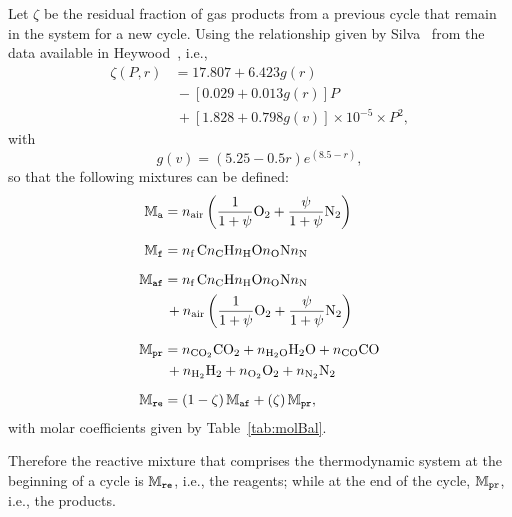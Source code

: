     Let $\zeta$ be the residual fraction of gas products from a previous cycle that remain in the system for a new cycle. Using the relationship given by Silva~\cite{2018-SilvaRKO-UTFPR}  from
    the data available in Heywood~\cite{1988-HeywoodJB-McGrawHill}, i.e.,%
    \begin{align}
        \zeta(P, r) &= 17.807 + 6.423g(r) \nonumber\\
                    &\,- [0.029 + 0.013g(r)] P \nonumber\\
                    &\,+ [1.828 + 0.798g(v)] \times 10^{-5} \times P^2,
        \label{eq:zeta}
    \end{align}
    \noindent with%
    \begin{equation}
        g(v) = (5.25 - 0.5r) e^{(8.5 - r)},
        \label{eq:g}
    \end{equation}
    \noindent so that the following mixtures can be defined:%
    \begin{align}
        \label{eq:MXAIR}
        \MXAIR  &=  \NA\left(
                        \frac{1}{1+\psi}\mbox{\ce{O2}} +
                        \frac{\psi}{1+\psi}\mbox{\ce{N2}}
                    \right)
                \\[\medskipamount]
        \label{eq:MXFUE}
        \MXFUE  &=  \NF\,\mbox{\ce{C\NC H\NH O\NO N\NN}}
                \\[\medskipamount]
        \label{eq:MXAFU}
        \MXAFU  &=  \NF\,\mbox{\ce{C\NC H\NH O\NO N\NN}} \nonumber\\
                &\,+\NA\left(
                        \frac{1}{1+\psi}\mbox{\ce{O2}} +
                        \frac{\psi}{1+\psi}\mbox{\ce{N2}}
                    \right)
                \\[\medskipamount]
        \label{eq:MXPRO}
        \MXPRO  &=  \NCOO\mbox{\ce{CO2}} +
                    \NHHO\mbox{\ce{H2O}} +
                    \NCO\mbox{\ce{CO}} \nonumber\\
                &\,+\NHH\mbox{\ce{H2}} +
                    \NOO\mbox{\ce{O2}} +
                    \NNN\mbox{\ce{N2}}
                \\[\medskipamount]
        \label{eq:MXREA}
        \MXREA  &=  (1 - \zeta)\,\MXAFU + (\zeta)\,\MXPRO,
    \end{align}
    \noindent with molar coefficients given by Table~\ref{tab:molBal}.

    Therefore the reactive mixture that comprises the thermodynamic system at the beginning of a cycle is $\mathbb{M}_{\mbox{\scriptsize\tt re}}$, i.e., the reagents; while at the end  of  the  cycle,  $\mathbb{M}_{\mbox{\scriptsize\tt pr}}$,  i.e.,  the
    products.


